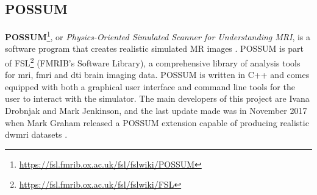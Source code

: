 

\subsection{POSSUM}
\textbf{POSSUM}\footnote{\url{https://fsl.fmrib.ox.ac.uk/fsl/fslwiki/POSSUM}}, or \textit{Physics-Oriented Simulated Scanner for Understanding MRI}, is a software program that creates realistic simulated MR images \cite{Drobnjak2006} \cite{Drobnjak2010}. 
POSSUM is part of FSL\footnote{\url{https://fsl.fmrib.ox.ac.uk/fsl/fslwiki/FSL}} (FMRIB's Software Library), a comprehensive library of analysis tools for \ac{mri}, \ac{fmri} and \ac{dti} brain imaging data.
POSSUM is written in C++ and comes equipped with both a graphical user interface and command line tools for the user to interact with the simulator.
The main developers of this project are Ivana Drobnjak and Mark Jenkinson, and the last update made was in November 2017 when Mark Graham released a POSSUM extension capable of producing realistic \ac{dwmri} datasets \cite{Graham2016}.

\hfill

